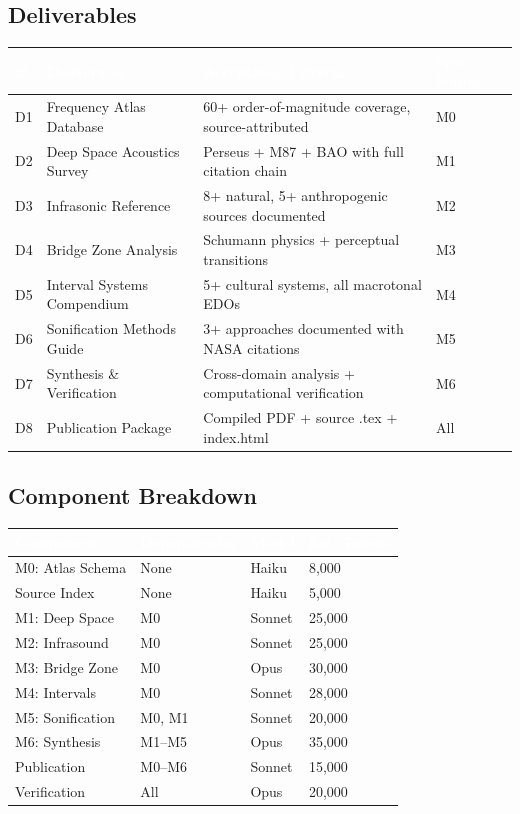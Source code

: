 \documentclass[11pt,letterpaper]{article}
\newcommand{\tableheader}[1]{\textbf{\sffamily\textcolor{white}{#1}}}
\begin{document}
\subsection{Deliverables}

\begin{center}
\begin{tabularx}{\textwidth}{C{0.8cm}L{3.5cm}XL{3cm}}
\toprule
{}
\tableheader{\#} & \tableheader{Deliverable} & \tableheader{Acceptance Criteria} & \tableheader{Spec Source} \\
\midrule
D1 & Frequency Atlas Database & 60+ order-of-magnitude coverage, source-attributed & M0 \\
D2 & Deep Space Acoustics Survey & Perseus + M87 + BAO with full citation chain & M1 \\
D3 & Infrasonic Reference & 8+ natural, 5+ anthropogenic sources documented & M2 \\
D4 & Bridge Zone Analysis & Schumann physics + perceptual transitions & M3 \\
D5 & Interval Systems Compendium & 5+ cultural systems, all macrotonal EDOs & M4 \\
D6 & Sonification Methods Guide & 3+ approaches documented with NASA citations & M5 \\
D7 & Synthesis \& Verification & Cross-domain analysis + computational verification & M6 \\
D8 & Publication Package & Compiled PDF + source .tex + index.html & All \\
\bottomrule
\end{tabularx}
\end{center}

\subsection{Component Breakdown}

\begin{center}
\begin{tabularx}{\textwidth}{L{3.5cm}L{2.5cm}C{1.5cm}C{2cm}}
\toprule
{}
\tableheader{Component} & \tableheader{Dependencies} & \tableheader{Model} & \tableheader{Est. Tokens} \\
\midrule
M0: Atlas Schema & None & Haiku & 8,000 \\
Source Index & None & Haiku & 5,000 \\
M1: Deep Space & M0 & Sonnet & 25,000 \\
M2: Infrasound & M0 & Sonnet & 25,000 \\
M3: Bridge Zone & M0 & Opus & 30,000 \\
M4: Intervals & M0 & Sonnet & 28,000 \\
M5: Sonification & M0, M1 & Sonnet & 20,000 \\
M6: Synthesis & M1--M5 & Opus & 35,000 \\
Publication & M0--M6 & Sonnet & 15,000 \\
Verification & All & Opus & 20,000 \\
\bottomrule
\end{tabularx}
\end{center}
\end{document}

